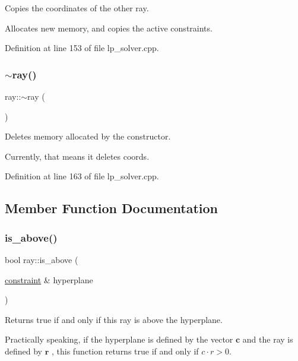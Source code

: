 Copies the coordinates of the other ray. 

Allocates new memory, and copies the active constraints. 

Definition at line 153 of file lp\+\_\+solver.\+cpp.

\mbox{\label{classray_ae29c6b5cecdc32127dc9e5c0141d120d}} 
\subsubsection{\texorpdfstring{$\sim$ray()}{~ray()}}
{\footnotesize\ttfamily ray\+::$\sim$ray (\begin{DoxyParamCaption}{ }\end{DoxyParamCaption})}



Deletes memory allocated by the constructor. 

Currently, that means it deletes {\ttfamily coords}. 

Definition at line 163 of file lp\+\_\+solver.\+cpp.



\subsection{Member Function Documentation}
\mbox{\label{classray_a5d4113ea6249145c337f4d26a54eb940}} 
\subsubsection{\texorpdfstring{is\+\_\+above()}{is\_above()}}
{\footnotesize\ttfamily bool ray\+::is\+\_\+above (\begin{DoxyParamCaption}\item[{\hyperlink{classconstraint}{constraint} \&}]{hyperplane }\end{DoxyParamCaption})\hspace{0.3cm}{\ttfamily [inline]}}



Returns {\ttfamily true} if and only if this ray is above the hyperplane. 

Practically speaking, if the hyperplane is defined by the vector $ \mathbf c $ and the ray is defined by $ \mathbf r $ , this function returns true if and only if $ c\cdot r > 0 $. 

